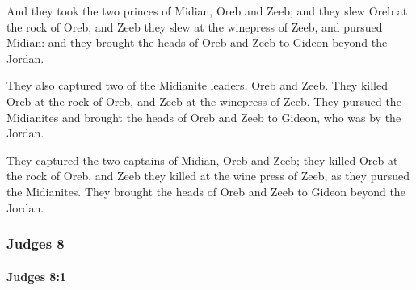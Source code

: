 			\begin{versebox}
					\item[BHS] 
					\item[ASV] And they took the two princes of Midian, Oreb and Zeeb; and they slew Oreb at the rock of Oreb, and Zeeb they slew at the winepress of Zeeb, and pursued Midian: and they brought the heads of Oreb and Zeeb to Gideon beyond the Jordan.
					\item[NIV] They also captured two of the Midianite leaders, Oreb and Zeeb. They killed Oreb at the rock of Oreb, and Zeeb at the winepress of Zeeb. They pursued the Midianites and brought the heads of Oreb and Zeeb to Gideon, who was by the Jordan.
					\item[NRSV] They captured the two captains of Midian, Oreb and Zeeb; they killed Oreb at the rock of Oreb, and Zeeb they killed at the wine press of Zeeb, as they pursued the Midianites. They brought the heads of Oreb and Zeeb to Gideon beyond the Jordan.
			\end{versebox}
	\subsubsection{Judges 8} %
		\label{JUDGES-8}

		\paragraph{Judges 8:1} %
			\label{JUDGES-8-1}

